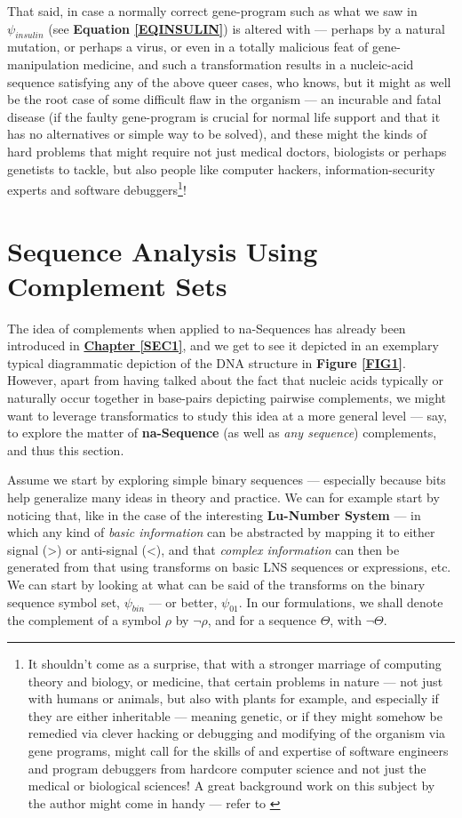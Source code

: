 \documentclass[a4paper, 18pt]{book} %
\begin{document}
That said, in case a normally correct gene-program such as what we saw in $\psi_{insulin}$ (see \textbf{Equation \ref{EQINSULIN}}) is altered with --- perhaps by a natural mutation, or perhaps a virus, or even in a totally malicious feat of gene-manipulation medicine, and such a transformation results in a nucleic-acid sequence satisfying any of the above queer cases, who knows, but it might as well be the root case of some difficult flaw in the organism --- an incurable and fatal disease (if the faulty gene-program is crucial for normal life support and that it has no alternatives or simple way to be solved), and these might the kinds of hard problems that might require not just medical doctors, biologists or perhaps genetists to tackle, but also people like computer hackers, information-security experts and software debuggers\footnote{It shouldn't come as a surprise, that with a stronger marriage of computing theory and biology, or medicine, that certain problems in nature --- not just with humans or animals, but also with plants for example, and especially if they are either inheritable --- meaning genetic, or if they might somehow be remedied via clever hacking or debugging and modifying of the organism via gene programs, might call for the skills of and expertise of software engineers and program debuggers from hardcore computer science and not just the medical or biological sciences! A great background work on this subject by the author might come in handy --- refer to \cite{Lutalo2025debug}}!

\chapter{Sequence Analysis Using Complement Sets}
\label{SEC3A}

The idea of complements when applied to na-Sequences has already been introduced in \textbf{\hyperref[SEC1]{Chapter \ref{SEC1}}}, and we get to see it depicted in an exemplary typical diagrammatic depiction of the DNA structure in \textbf{Figure \ref{FIG1}}. However, apart from having talked about the fact that nucleic acids typically or naturally occur together in base-pairs depicting pairwise complements, we might want to leverage transformatics to study this idea at a more general level --- say, to explore the matter of \textbf{na-Sequence} (as well as \textit{any sequence}) complements, and thus this section.

Assume we start by exploring simple binary sequences --- especially because bits help generalize many ideas in theory and practice. We can for example start by noticing that, like in the case of the interesting \textbf{Lu-Number System}\cite{lnspaper} --- in which any kind of \textit{basic information} can be abstracted by mapping it to either signal (>) or anti-signal (<), and that \textit{complex information} can then be generated from that using transforms on basic LNS sequences or expressions, etc. We can start by looking at what can be said of the transforms on the binary sequence symbol set, $\psi_{bin}$ --- or better, $\psi_{01}$. In our formulations, we shall denote the complement of a symbol $\rho$ by $\lnot\rho$, and for a sequence $\Theta$, with $\lnot\Theta$.
\end{document}
